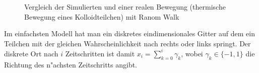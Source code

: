 \documentclass[a4paper]{book}
\begin{document}
\begin{figure}
  \caption{Vergleich der Simulierten und einer realen Bewegung
    (thermische Bewegung eines Kolloidteilchen) mit Ranom Walk}
  \label{fig:vgl-real-rw}
\end{figure}


Im einfachsten Modell hat man ein diskretes eindimensionales Gitter
auf dem ein Teilchen mit der gleichen Wahrscheinlichkeit nach rechts
oder links springt. Der diskrete Ort nach $i$ Zeitschritten ist damit
$x_i = \sum_{k = 0}^i \gamma_k$, wobei $\gamma_k \in \{-1,1\}$ die
Richtung des n"achsten Zeitschritts angibt.
\end{document}
